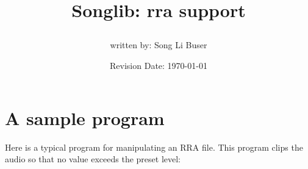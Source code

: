 \documentclass{article}
\title{Songlib: rra support\\
\date{Revision Date: \today}}
\author{written by: Song Li Buser}
\begin{document}
\maketitle

\W\subsubsection*{}
\W\htmlrule

\section*{A sample program}

Here is a typical program for manipulating an RRA file. This program
clips the audio so that no value exceeds the preset level:
\end{document}
